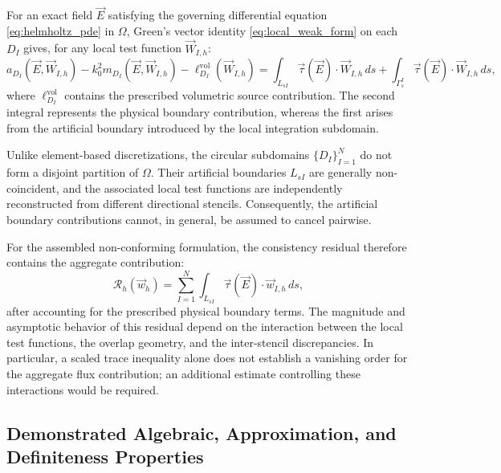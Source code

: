 \documentclass[VANCOUVER,Times1COL]{WileyNJD-v5}
\begin{document}
For an exact field $\vec{E}$ satisfying the governing differential equation \eqref{eq:helmholtz_pde} in $\Omega$, Green's vector identity \eqref{eq:local_weak_form} on each $D_I$ gives, for any local test function $\vec{W}_{I,h}$:
\begin{equation}
    a_{D_I}(\vec{E}, \vec{W}_{I,h}) - k_0^2 m_{D_I}(\vec{E}, \vec{W}_{I,h}) - \ell_{D_I}^{\mathrm{vol}}(\vec{W}_{I,h}) = \int_{L_{sI}} \vec{\tau}(\vec{E}) \cdot \vec{W}_{I,h} \, ds + \int_{\Gamma_s^I} \vec{\tau}(\vec{E}) \cdot \vec{W}_{I,h} \, ds,
    \label{eq:local_green_flux_balance}
\end{equation}
where $\ell_{D_I}^{\mathrm{vol}}$ contains the prescribed volumetric source contribution. The second integral represents the physical boundary contribution, whereas the first arises from the artificial boundary introduced by the local integration subdomain.

Unlike element-based discretizations, the circular subdomains $\{D_I\}_{I=1}^N$ do not form a disjoint partition of $\Omega$. Their artificial boundaries $L_{sI}$ are generally non-coincident, and the associated local test functions are independently reconstructed from different directional stencils. Consequently, the artificial boundary contributions cannot, in general, be assumed to cancel pairwise.

For the assembled non-conforming formulation, the consistency residual therefore contains the aggregate contribution:
\begin{equation}
    \mathcal{R}_h(\vec{w}_h) = \sum_{I=1}^N \int_{L_{sI}} \vec{\tau}(\vec{E}) \cdot \vec{w}_{I,h} \, ds,
    \label{eq:global_consistency_residual}
\end{equation}
after accounting for the prescribed physical boundary terms. The magnitude and asymptotic behavior of this residual depend on the interaction between the local test functions, the overlap geometry, and the inter-stencil discrepancies. In particular, a scaled trace inequality alone does not establish a vanishing order for the aggregate flux contribution; an additional estimate controlling these interactions would be required.

\subsection{Demonstrated Algebraic, Approximation, and Definiteness Properties}
\label{subsubsec:demonstrated_properties}
\end{document}
